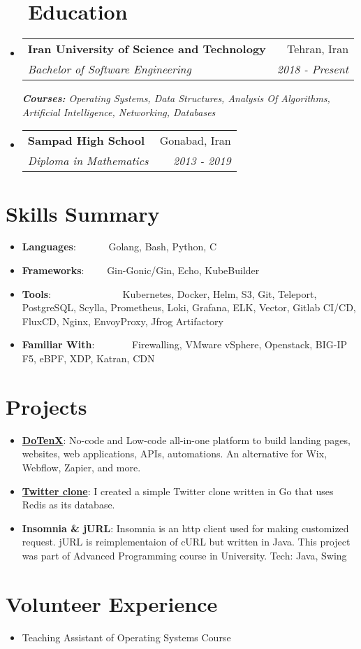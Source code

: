 \documentclass[a4paper,20pt]{article}
\makeatletter
\newcommand{\resumeItem}[2]{
  \item\small{
    \textbf{#1}{: #2 \vspace{-2pt}}
  }
}
\newcommand{\resumeSubheading}[4]{
  \vspace{-1pt}\item
    \begin{tabular*}{0.97\textwidth}{l@{\extracolsep{\fill}}r}
      \textbf{#1} & #2 \\
      \textit{#3} & \textit{#4} \\
    \end{tabular*}\vspace{-5pt}
}
\newcommand{\resumeSubItem}[2]{\resumeItem{#1}{#2}\vspace{-3pt}}
\newcommand{\resumeSubHeadingListStart}{\begin{itemize}[leftmargin=*, label={}]}
\newcommand{\resumeSubHeadingListEnd}{\end{itemize}}
\makeatother
\begin{document}
\section{~~Education}
  \resumeSubHeadingListStart
      \resumeSubheading
      {Iran University of Science and Technology}{Tehran, Iran}
      {Bachelor of Software Engineering}{2018 - Present}
      {\scriptsize \textit{ \footnotesize{\newline{}\textbf{Courses:} Operating Systems, Data Structures, Analysis Of Algorithms, Artificial Intelligence, Networking, Databases}}}
    \resumeSubheading
      {Sampad High School}{Gonabad, Iran}
      {Diploma in Mathematics}{2013 - 2019}
    \resumeSubHeadingListEnd
    
	    
\vspace{-5pt}
\section{Skills Summary}
	\resumeSubHeadingListStart
	\resumeSubItem{Languages}{~~~~~~Golang, Bash, Python, C}
	\resumeSubItem{Frameworks}{~~~~Gin-Gonic/Gin, Echo, KubeBuilder}
	\resumeSubItem{Tools}{~~~~~~~~~~~~~~Kubernetes, Docker, Helm, S3, Git, Teleport, PostgreSQL, Scylla, Prometheus, Loki, Grafana, ELK, Vector, Gitlab CI/CD, FluxCD, Nginx, EnvoyProxy, Jfrog Artifactory}
	\resumeSubItem{Familiar With}{~~~~~~~Firewalling, VMware vSphere, Openstack, BIG-IP F5, eBPF, XDP, Katran, CDN}

\resumeSubHeadingListEnd
\vspace{-5pt}
\section{Projects}
\resumeSubHeadingListStart
\resumeSubItem{\href{https://github.com/dotenx/dotenx}{DoTenX}}{No-code and Low-code all-in-one platform to build landing pages, websites, web applications, APIs, automations. An alternative for Wix, Webflow, Zapier, and more.}
\vspace{2pt}
\resumeSubItem{\href{https://github.com/hawwwdi/Twitter_clone}{Twitter clone}}{I created a simple Twitter clone written in Go that uses Redis as its database.}
\vspace{2pt}
\resumeSubItem{Insomnia \& jURL}{Insomnia is an http client used for making customized request. jURL is reimplementaion of cURL but written in Java. This project was part of Advanced Programming course in University. Tech: Java, Swing}
\vspace{2pt}
\resumeSubHeadingListEnd

\vspace{-2pt}
\section{Volunteer Experience}
\begin{itemize}
    \item {Teaching Assistant of Operating Systems Course}
\end{itemize}
\end{document}

